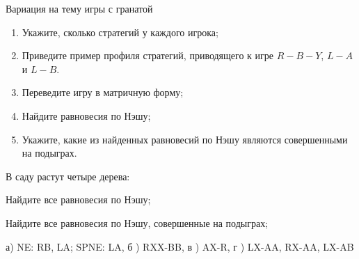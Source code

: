 \begin{problem}
 Вариация на тему игры с гранатой\par
\begin{enumerate}
\item  Укажите, сколько стратегий у каждого игрока;\par
\item Приведите пример профиля стратегий, приводящего к игре  $R-B-Y$,  $L-A$  и  $L-B$.\par
\item  Переведите игру в матричную форму;\par
\item Найдите равновесия по Нэшу;\par
\item Укажите, какие из найденных равновесий по Нэшу являются совершенными на подыграх.
\end{enumerate}

\begin{sol}

\end{sol}
\end{problem}



\begin{problem}

В саду растут четыре дерева:\par
{}
Найдите все равновесия по Нэшу;\par
Найдите все равновесия по Нэшу, совершенные на подыграх;



\begin{sol}
 а)  NE: RB, LA; SPNE: LA, б ) RXX-BB, в ) AX-R, г ) LX-AA, RX-AA, LX-AB
\end{sol}
\end{problem}




